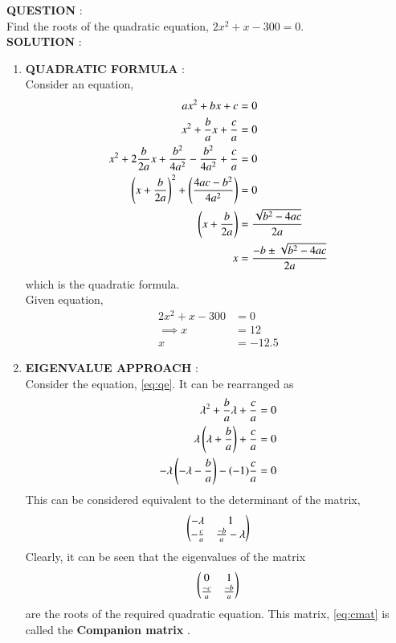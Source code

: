 \documentclass[journal]{IEEEtran}
\begin{document}
\textbf{QUESTION} : \\
Find the roots of the quadratic equation, $2x^{2} + x - 300 = 0$. \\
\textbf{SOLUTION} : \\
\begin{enumerate}
	\item \textbf{QUADRATIC FORMULA} : \\
	Consider an equation, 
	\begin{align}
		ax^2 + bx + c &= 0 \\
	        x^2 + \frac{b}{a} x + \frac{c}{a} &= 0 \label{eq:qe} \\
		x^2 + 2 \frac{b}{2a} x + \frac{b^2}{4a^2} - \frac{b^2}{4a^2} + \frac{c}{a} &= 0 \\
		\left(x + \frac{b}{2a}\right)^2 + \left(\frac{4ac - b^2}{4a^2}\right) &= 0 \\
		\left(x + \frac{b}{2a}\right) &= \frac{\sqrt{b^2 - 4ac}}{2a} \\
		x &= \frac{-b \pm \sqrt{b^2 - 4ac}}{2a}
	\end{align}
	which is the quadratic formula. \\
Given equation, 
\begin{align}
 2x^2 + x - 300 &= 0 \\
	\implies x &= 12 \\
	x &= -12.5
\end{align}
	\item \textbf{EIGENVALUE APPROACH} : \\
	Consider the equation, \eqref{eq:qe}. It can be rearranged as
	\begin{align}
		\lambda ^2 + \frac{b}{a} \lambda + \frac{c}{a} &= 0 \\
		\lambda \left(\lambda + \frac{b}{a}\right) + \frac{c}{a} &= 0 \\
		-\lambda \left(-\lambda - \frac{b}{a}\right) - (-1) \frac{c}{a} &= 0
	\end{align}
	This can be considered equivalent to the determinant of the matrix, 
	\begin{align}
		\begin{pmatrix}-\lambda & 1 \\ -\frac{c}{a} & \frac{-b}{a} - \lambda\end{pmatrix} \label{eq:matrix}
	\end{align}
	Clearly, it can be seen that the eigenvalues of the matrix 
	\begin{align}
		\begin{pmatrix}0 & 1 \\ \frac{-c}{a} & \frac{-b}{a}\end{pmatrix} \label{eq:cmat}
	\end{align}
	are the roots of the required quadratic equation. This matrix, \eqref{eq:cmat} is called the \textbf{Companion matrix} . \\

\end{enumerate}
\end{document}
